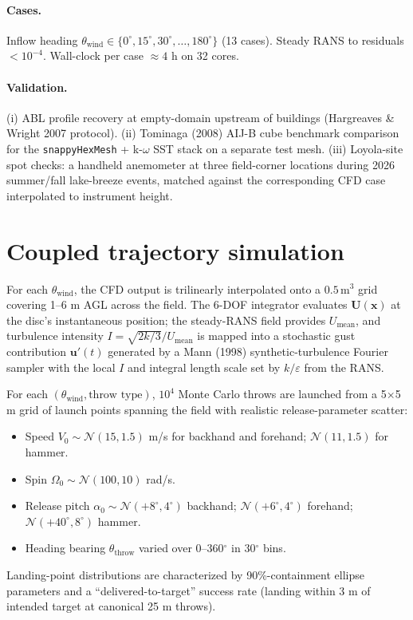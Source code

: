 \documentclass[11pt,letterpaper]{article}
\begin{document}
\paragraph{Cases.} Inflow heading $\theta_{\text{wind}} \in \{0^\circ, 15^\circ, 30^\circ, \ldots, 180^\circ\}$ (13 cases). Steady RANS to residuals $<10^{-4}$. Wall-clock per case $\approx 4$ h on 32 cores.

\paragraph{Validation.} (i) ABL profile recovery at empty-domain upstream of buildings (Hargreaves \& Wright 2007 protocol). (ii) Tominaga (2008) AIJ-B cube benchmark comparison for the \texttt{snappyHexMesh} + k-$\omega$ SST stack on a separate test mesh. (iii) Loyola-site spot checks: a handheld anemometer at three field-corner locations during 2026 summer/fall lake-breeze events, matched against the corresponding CFD case interpolated to instrument height.

\section{Coupled trajectory simulation}

For each $\theta_{\text{wind}}$, the CFD output is trilinearly interpolated onto a $0.5\,\text{m}^3$ grid covering 1--6 m AGL across the field. The 6-DOF integrator evaluates $\mathbf{U}(\mathbf{x})$ at the disc's instantaneous position; the steady-RANS field provides $U_{\text{mean}}$, and turbulence intensity $I = \sqrt{2k/3}/U_{\text{mean}}$ is mapped into a stochastic gust contribution $\mathbf{u}'(t)$ generated by a Mann (1998) synthetic-turbulence Fourier sampler with the local $I$ and integral length scale set by $k/\varepsilon$ from the RANS.

For each $(\theta_{\text{wind}}, \text{throw type})$, $10^4$ Monte Carlo throws are launched from a 5$\times$5 m grid of launch points spanning the field with realistic release-parameter scatter:
\begin{itemize}[leftmargin=*,itemsep=1pt]
  \item Speed $V_0 \sim \mathcal{N}(15, 1.5)$ m/s for backhand and forehand; $\mathcal{N}(11, 1.5)$ for hammer.
  \item Spin $\Omega_0 \sim \mathcal{N}(100, 10)$ rad/s.
  \item Release pitch $\alpha_0 \sim \mathcal{N}(+8^\circ, 4^\circ)$ backhand; $\mathcal{N}(+6^\circ, 4^\circ)$ forehand; $\mathcal{N}(+40^\circ, 8^\circ)$ hammer.
  \item Heading bearing $\theta_{\text{throw}}$ varied over 0--360$^\circ$ in 30$^\circ$ bins.
\end{itemize}
Landing-point distributions are characterized by 90\%-containment ellipse parameters and a ``delivered-to-target'' success rate (landing within 3 m of intended target at canonical 25 m throws).
\end{document}
